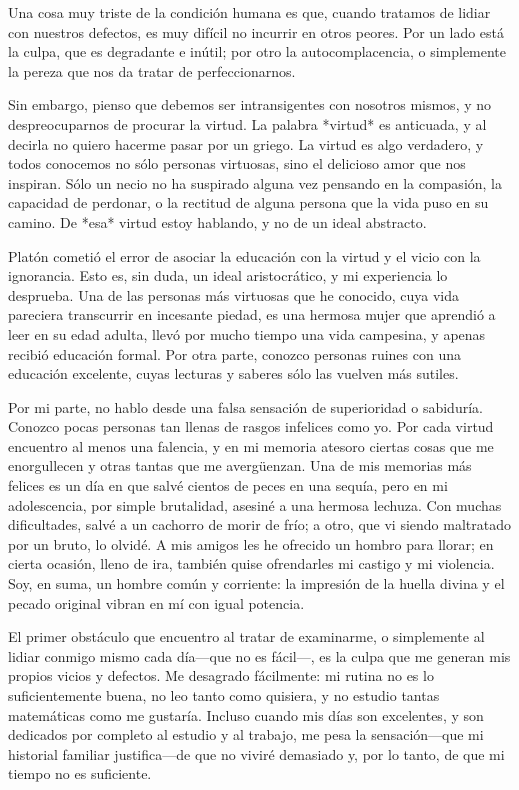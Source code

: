 \documentclass[a4paper, 12pt]{article}
\begin{document}
Una cosa muy triste de la condición humana es que, cuando tratamos de lidiar
con nuestros defectos, es muy difícil no incurrir en otros peores. Por un lado
está la culpa, que es degradante e inútil; por otro la autocomplacencia, o
simplemente la pereza que nos da tratar de perfeccionarnos. 

Sin embargo, pienso que debemos ser intransigentes con nosotros mismos, y no
despreocuparnos de procurar la virtud. La palabra *virtud* es anticuada, y al
decirla no quiero hacerme pasar por un griego. La virtud es algo verdadero, y
todos conocemos no sólo personas virtuosas, sino el delicioso amor que nos
inspiran. Sólo un necio no ha suspirado alguna vez pensando en la compasión, la
capacidad de perdonar, o la rectitud de alguna persona que la vida puso en su
camino. De *esa* virtud estoy hablando, y no de un ideal abstracto.

Platón cometió el error de asociar la educación con la virtud y el vicio con la
ignorancia. Esto es, sin duda, un ideal aristocrático, y mi experiencia lo
desprueba. Una de las personas más virtuosas que he conocido, cuya vida
pareciera transcurrir en incesante piedad, es una hermosa mujer que aprendió a
leer en su edad adulta, llevó por mucho tiempo una vida campesina, y apenas
recibió educación formal. Por otra parte, conozco personas ruines con una
educación excelente, cuyas lecturas y saberes sólo las vuelven más sutiles.

Por mi parte, no hablo desde una falsa sensación de superioridad o sabiduría.
Conozco pocas personas tan llenas de rasgos infelices como yo. Por cada virtud
encuentro al menos una falencia, y en mi memoria atesoro ciertas cosas que me
enorgullecen y otras tantas que me avergüenzan. Una de mis memorias más felices
es un día en que salvé cientos de peces en una sequía, pero en mi adolescencia,
por simple brutalidad, asesiné a una hermosa lechuza. Con muchas dificultades,
salvé a un cachorro de morir de frío; a otro, que vi siendo maltratado por un
bruto, lo olvidé. A mis amigos les he ofrecido un hombro para llorar; en cierta
ocasión, lleno de ira, también quise ofrendarles mi castigo y mi violencia.
Soy, en suma, un hombre común y corriente: la impresión de la huella divina y
el pecado original vibran en mí con igual potencia. 

El primer obstáculo que encuentro al tratar de examinarme, o simplemente al
lidiar conmigo mismo cada día—que no es fácil—, es la culpa que me generan
mis propios vicios y defectos. Me desagrado fácilmente: mi rutina no es lo
suficientemente buena, no leo tanto como quisiera, y no estudio tantas
matemáticas como me gustaría. Incluso cuando mis días son excelentes, y son
dedicados por completo al estudio y al trabajo, me pesa la sensación—que mi
historial familiar justifica—de que no viviré demasiado y, por lo tanto, de
que mi tiempo no es suficiente. 
\end{document}
